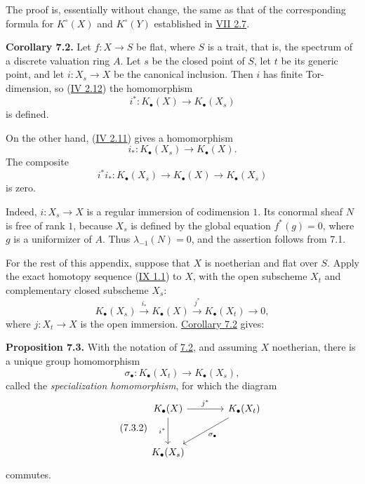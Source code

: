 The proof is, essentially without change, the same as that of the
corresponding formula for $K^\circ(X)$ and $K^\circ(Y)$ established in
\hyperlink{sga6.e07.para.2-6}{VII 2.7}.

\textbf{Corollary 7.2.}
Let $f:X\to S$ be flat, where $S$ is a trait, that is, the spectrum of a
discrete valuation ring $A$. Let $s$ be the closed point of $S$, let $t$ be
its generic point, and let $i:X_s\to X$ be the canonical inclusion. Then
$i$ has finite Tor-dimension, so (\hyperlink{sga6.e04.para.2-12}{IV 2.12}) the homomorphism
\[
i^*:K_\bullet(X)\longrightarrow K_\bullet(X_s)
\]
is defined.

On the other hand, (\hyperlink{sga6.e04.para.2-11}{IV 2.11}) gives a homomorphism
\[
i_*:K_\bullet(X_s)\longrightarrow K_\bullet(X).
\]
The composite
\[
i^*i_*:K_\bullet(X_s)\longrightarrow K_\bullet(X)
\longrightarrow K_\bullet(X_s)
\]
is zero.

Indeed, $i:X_s\to X$ is a regular immersion of codimension $1$. Its
conormal sheaf $N$ is free of rank $1$, because $X_s$ is defined by the
global equation $f^*(g)=0$, where $g$ is a uniformizer of $A$. Thus
$\lambda_{-1}(N)=0$, and the assertion follows from 7.1.

For the rest of this appendix, suppose that $X$ is noetherian and flat over
$S$. Apply the exact homotopy sequence (\hyperlink{sga6.e09.prop.1-1}{IX 1.1}) to $X$, with the open
subscheme $X_t$ and complementary closed subscheme $X_s$:
\[
K_\bullet(X_s)\xrightarrow{i_*}K_\bullet(X)
\xrightarrow{j^*}K_\bullet(X_t)\longrightarrow0,
\]
where $j:X_t\to X$ is the open immersion. \hyperlink{sga6.e10.cor.7-2}{Corollary 7.2} gives:

\textbf{Proposition 7.3.}
With the notation of \hyperlink{sga6.e10.cor.7-2}{7.2}, and assuming $X$ noetherian, there is a unique
group homomorphism
\begin{equation}\tag{7.3.1}
\sigma_\bullet:K_\bullet(X_t)\longrightarrow K_\bullet(X_s),
\end{equation}
called the \emph{specialization homomorphism}, for which the diagram
\begin{equation}\tag{7.3.2}
\begin{tikzcd}[column sep=large,row sep=large]
K_\bullet(X) \arrow[r,"j^*"] \arrow[d,"i^*"'] &
K_\bullet(X_t) \arrow[dl,"\sigma_\bullet"]\\
K_\bullet(X_s) &
\end{tikzcd}
\end{equation}
commutes.

